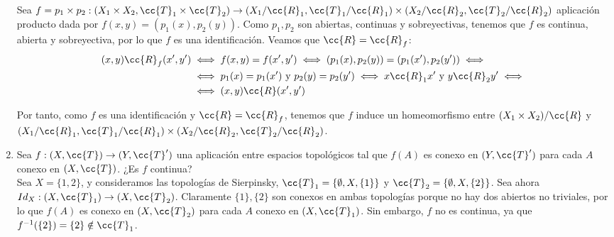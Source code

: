 \documentclass[12pt]{article}
\newcommand{\T}[0]{\cc{T}}
\begin{document}
\begin{ejercicio}[3 puntos]
\begin{enumerate}
            Sea $f=p_1\times p_2: (X_1\times X_2, \T_1\times \T_2)\to (X_1/\cc{R}_1,\T_1/\cc{R}_1)\times (X_2/\cc{R}_2,\T_2/\cc{R}_2)$
            aplicación producto dada por $f(x,y)=(p_1(x), p_2(y))$. Como $p_1, p_2$ son abiertas, continuas y sobreyectivas, tenemos que $f$ es continua, abierta y sobreyectiva,
            por lo que $f$ es una identificación. Veamos que $\cc{R}=\cc{R}_f$:
            \begin{align*}
                (x,y)\cc{R}_f (x',y') &\iff
                f(x,y)=f(x',y') \iff
                (p_1(x), p_2(y)) = (p_1(x'), p_2(y')) \iff\\
                &\iff p_1(x)=p_1(x') \text{ y } p_2(y)=p_2(y') \iff
                x\cc{R}_1 x' \text{ y } y\cc{R}_2 y' \iff\\
                &\iff (x,y)\cc{R} (x',y')
            \end{align*}

            Por tanto, como $f$ es una identificación y $\cc{R}=\cc{R}_f$, tenemos que $f$ induce un homeomorfismo entre $(X_1\times X_2)/\cc{R}$ y $(X_1/\cc{R}_1,\T_1/\cc{R}_1)\times (X_2/\cc{R}_2,\T_2/\cc{R}_2)$.


            \item Sea $f:(X,\T)\to (Y,\T')$ una aplicación entre espacios topológicos tal que $f(A)$ es conexo en $(Y,\T')$
            para cada $A$ conexo en $(X,\T)$. ¿Es $f$ continua?\\

            Sea $X=\{1,2\}$, y consideramos las topologías de Sierpinsky,
            $\T_1 = \{\emptyset, X, \{1\}\}$ y $\T_2 = \{\emptyset, X, \{2\}\}$. Sea ahora ${Id}_X:\left(X, \T_1\right)\to \left(X, \T_2\right)$.
            Claramente $\{1\},\{2\}$ son conexos en ambas topologías porque no hay dos abiertos no triviales,
            por lo que $f(A)$ es conexo en $(X,\T_2)$ para cada $A$ conexo en $(X,\T_1)$. Sin embargo, $f$ no es continua, ya que
            $f^{-1}(\{2\}) = \{2\}\notin \T_1$.
        \end{enumerate}
    \end{ejercicio}
\end{document}
